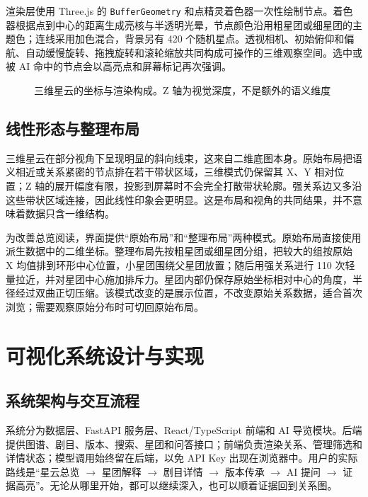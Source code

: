 \documentclass[12pt,a4paper]{article}
\begin{document}
渲染层使用 Three.js 的 \texttt{BufferGeometry} 和点精灵着色器一次性绘制节点。着色器根据点到中心的距离生成亮核与半透明光晕，节点颜色沿用粗星团或细星团的主题色；连线采用加色混合，背景另有 420 个随机星点。透视相机、初始俯仰和偏航、自动缓慢旋转、拖拽旋转和滚轮缩放共同构成可操作的三维观察空间。选中或被 AI 命中的节点会以高亮点和屏幕标记再次强调。

\begin{figure}[H]
  \centering
  \caption{三维星云的坐标与渲染构成。Z 轴为视觉深度，不是额外的语义维度}
  \label{fig:3dflow}
\end{figure}

\subsection{线性形态与整理布局}
三维星云在部分视角下呈现明显的斜向线束，这来自二维底图本身。原始布局把语义相近或关系紧密的节点排在若干带状区域，三维模式仍保留其 X、Y 相对位置；Z 轴的展开幅度有限，投影到屏幕时不会完全打散带状轮廓。强关系边又多沿这些带状区域连接，因此线性印象会更明显。这是布局和视角的共同结果，并不意味着数据只含一维结构。

为改善总览阅读，界面提供“原始布局”和“整理布局”两种模式。原始布局直接使用派生数据中的二维坐标。整理布局先按粗星团或细星团分组，把较大的组按原始 X 均值排到环形中心位置，小星团围绕父星团放置；随后用强关系进行 110 次轻量拉近，并对星团中心施加排斥力。星团内部仍保存原始坐标相对中心的角度，半径经过双曲正切压缩。该模式改变的是展示位置，不改变原始关系数据，适合首次浏览；需要观察原始分布时可切回原始布局。

\section{可视化系统设计与实现}
\subsection{系统架构与交互流程}
系统分为数据层、FastAPI 服务层、React/TypeScript 前端和 AI 导览模块。后端提供图谱、剧目、版本、搜索、星团和问答接口；前端负责渲染关系、管理筛选和详情状态；模型调用始终留在后端，以免 API Key 出现在浏览器中。用户的实际路线是“星云总览 $\rightarrow$ 星团解释 $\rightarrow$ 剧目详情 $\rightarrow$ 版本传承 $\rightarrow$ AI 提问 $\rightarrow$ 证据高亮”。无论从哪里开始，都可以继续深入，也可以顺着证据回到关系图。
\end{document}
